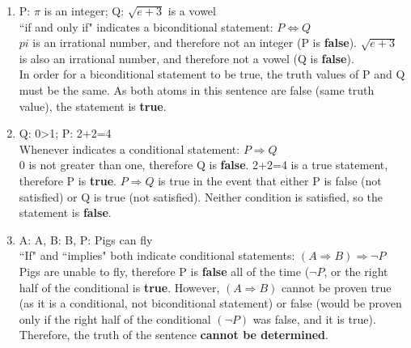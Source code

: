 \documentclass{article}
\theoremstyle{definition}
\begin{document}
\begin{enumerate}[label = \alph*)]
    \item 
    P: $\pi$ is an integer; Q: $\sqrt{e+3}$ is a vowel\\
    ``if and only if" indicates a biconditional statement: $P \Leftrightarrow Q$ \\
    $pi$ is an irrational number, and therefore not an integer (P is \textbf{false}). $\sqrt{e+3}$ is also an irrational number, and therefore not a vowel (Q is \textbf{false}). \\
    In order for a biconditional statement to be true, the truth values of P and Q must be the same. As both atoms in this sentence are false (same truth value), the statement is \textbf{true}.
    
    \item 
    Q: 0>1; P: 2+2=4\\
    Whenever indicates a conditional statement: $P \Rightarrow Q$ \\
    0 is not greater than one, therefore Q is \textbf{false}. 2+2=4 is a true statement, therefore P is \textbf{true}. $P\Rightarrow Q$ is true in the event that either P is false (not satisfied) or Q is true (not satisfied). Neither condition is satisfied, so the statement is \textbf{false}.
    
    \item
    A: A, B: B, P: Pigs can fly \\
    ``If" and ``implies" both indicate conditional statements: $(A\Rightarrow B) \Rightarrow \neg P$ \\
    Pigs are unable to fly, therefore P is \textbf{false} all of the time ($\neg P$, or the right half of the conditional is \textbf{true}. However, $(A\Rightarrow B)$ cannot be proven true (as it is a conditional, not biconditional statement) or false (would be proven only if the right half of the conditional $(\neg P)$ was false, and it is true). Therefore, the truth of the sentence \textbf{cannot be determined}.
    
\end{enumerate}
\end{document}
